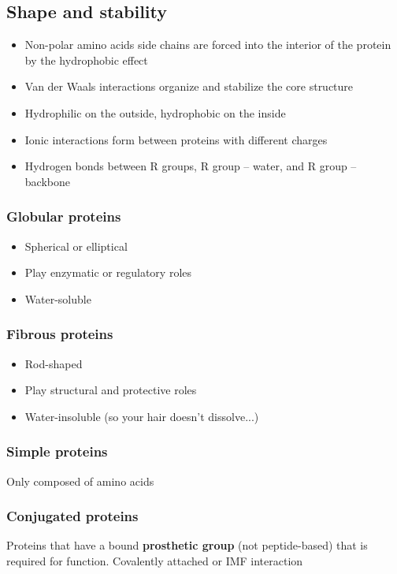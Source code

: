 \documentclass[letterpaper, 12pt]{article}
\begin{document}
\subsection*{Shape and stability}

\begin{itemize}
\item Non-polar amino acids side chains are forced into the interior of the protein by the hydrophobic effect
\item Van der Waals interactions organize and stabilize the core structure
\item Hydrophilic on the outside, hydrophobic on the inside
\item Ionic interactions form between proteins with different charges
\item Hydrogen bonds between R groups, R group -- water, and R group -- backbone
\end{itemize}

\subsubsection*{Globular proteins}

\begin{itemize}
\item Spherical or elliptical
\item Play enzymatic or regulatory roles
\item Water-soluble
\end{itemize}

\subsubsection*{Fibrous proteins}

\begin{itemize}
\item Rod-shaped
\item Play structural and protective roles
\item Water-insoluble (so your hair doesn't dissolve...)
\end{itemize}

\subsubsection*{Simple proteins}
Only composed of amino acids

\subsubsection*{Conjugated proteins}
Proteins that have a bound \textbf{prosthetic group} (not peptide-based) that is required for function. Covalently attached or IMF interaction
\end{document}
